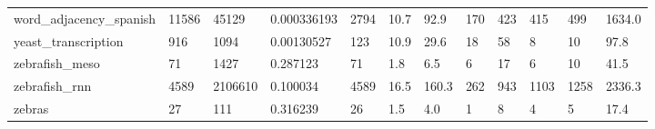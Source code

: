 \begin{longtable}{llllllllllll}
 word\_adjacency\_spanish                             & 11586      & 45129     & 0.000336193 & 2794  & 10.7   & 92.9   & 170   & 423    & 415    & 499    & 1634.0  \\
 yeast\_transcription                                & 916        & 1094      & 0.00130527  & 123   & 10.9   & 29.6   & 18    & 58     & 8      & 10     & 97.8    \\
 zebrafish\_meso                                     & 71         & 1427      & 0.287123    & 71    & 1.8    & 6.5    & 6     & 17     & 6      & 10     & 41.5    \\
 zebrafish\_rnn                                      & 4589       & 2106610   & 0.100034    & 4589  & 16.5   & 160.3  & 262   & 943    & 1103   & 1258   & 2336.3  \\
 zebras                                             & 27         & 111       & 0.316239    & 26    & 1.5    & 4.0    & 1     & 8      & 4      & 5      & 17.4    \\
\hline
\end{longtable}